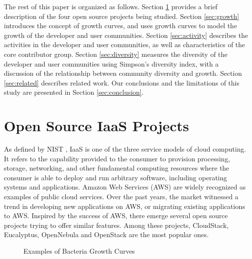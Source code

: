 \documentclass[conference]{IEEEtran}
\begin{document}
The rest of this paper is organized as follows. Section \ref{sec:projects} provides a brief description of the four open source projects being studied. Section \ref{sec:growth} introduces the concept of growth curves, and uses growth curves to model the growth of the developer and user communities. Section \ref{sec:activity} describes the activities in the developer and user communities, as well as characteristics of the core contributor group. Section \ref{sec:diversity} measures the diversity of the developer and user communities using Simpson's diversity index, with a discussion of the relationship between community diversity and growth. Section \ref{sec:related} describes related work. Our conclusions and the limitations of this study are presented in Section \ref{sec:conclusion}.

\section{Open Source IaaS Projects}
\label{sec:projects}

As defined by NIST \cite{nist}, IaaS is one of the three service models of cloud computing. It refers to the capability provided to the consumer to provision processing, storage, networking, and other fundamental computing resources where the consumer is able to deploy and run arbitrary software, including operating systems and applications. Amazon Web Services (AWS) are widely recognized as examples of public cloud services. Over the past years, the market witnessed a trend in developing new applications on AWS, or migrating existing applications to AWS. Inspired by the success of AWS, there emerge several open source projects trying to offer similar features. Among these projects, CloudStack, Eucalyptus, OpenNebula and OpenStack are the most popular ones.  

\begin{figure}[t!]
    \hspace{2pt}
  \caption{Examples of Bacteria Growth Curves} 
  \vspace{-10pt}
  \label{fig:growth_bacteria} 
\end{figure}
\end{document}
